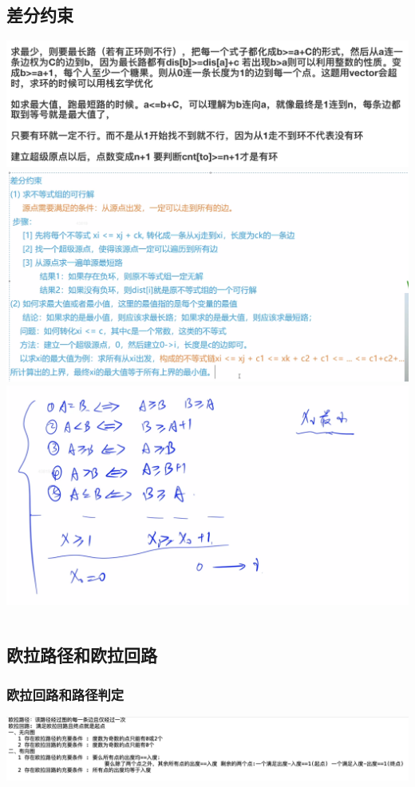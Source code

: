 \documentclass[a4paper,11pt]{article}
\begin{document}
\subsection{差分约束}
\includegraphics[scale=0.6]{图论/差分1.png}
\includegraphics[scale=0.6]{图论/差分2.png}
\includegraphics[scale=0.6]{图论/差分3.png}
\inputminted[breaklines]{c++}{图论/差分约束.cpp}
\subsection{欧拉路径和欧拉回路}
\subsubsection{欧拉回路和路径判定} %
\includegraphics[scale=0.6]{图论/欧拉.png}
\end{document}

